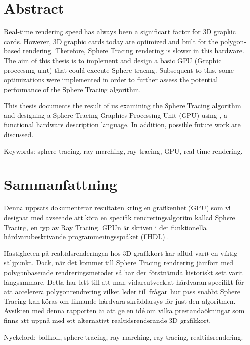 \thispagestyle{plain}			%
\setlength{\parskip}{0pt plus 1.0pt}

\section*{Abstract}
	
	Real-time rendering speed has always been a significant factor for 3D
	graphic cards. However, 3D graphic cards today are optimized and built for
	the polygon-based rendering. Therefore, Sphere Tracing rendering is slower
	in this hardware. The aim of this thesis is to implement and design a
	basic GPU (Graphic proccesing unit) that could execute Sphere tracing.
	Subsequent to this, some optimizations were implemented in order to further
	assess the potential performance of the Sphere Tracing algorithm.
	
	This thesis documents the result of us examining the Sphere Tracing
	algorithm and designing a Sphere Tracing Graphics Processing Unit (GPU) 
	using \clash, a functional hardware description language. In addition, 
	possible future work are discussed.

	\vfill
	Keywords: sphere tracing, ray marching, ray tracing, GPU, real-time rendering.

\newpage
\thispagestyle{plain}

\section*{Sammanfattning}
	
	Denna uppsats dokumenterar resultaten kring en grafikenhet (GPU) som vi
	designat med avseende att köra en specifik rendreringsalgoritm kallad Sphere
	Tracing, en typ av Ray Tracing. GPUn är skriven i det funktionella
	hårdvarubeskrivande programmeringsspråket (FHDL) \clash.
	
	Hastigheten på realtidsrenderingen hos 3D grafikkort har alltid varit en
	viktig säljpunkt. Dock, när det kommer till Sphere Tracing rendrering jämfört
	med polygonbaserade rendreringsmetoder så har den förstnämda historiskt sett
	varit långsammare. Detta har lett till att man vidareutvecklat hårdvaran
	specifikt för att accelerera polygonrendrering vilket leder till frågan hur
	pass snabbt Sphere Tracing kan köras om liknande hårdvara skräddarsys för
	just den algoritmen. Avsikten med denna rapporten är att ge en idé om vilka
	prestandaökningar som finns att uppnå med ett alternativt realtidsrenderande
	3D grafikkort.
	
	\vfill
	Nyckelord: bollkoll, sphere tracing, ray marching, ray tracing, realtidsrendering.


\newpage
\thispagestyle{empty}
\mbox{}
